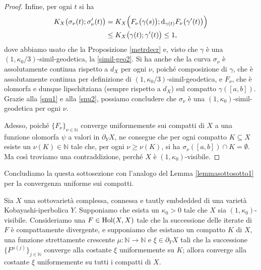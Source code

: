 \begin{proof}
    Infine, per ogni $t$ si ha
    \begin{equation} \label{snu2}
        \begin{aligned}
            K_X\big(\sigma_\nu(t);\sigma_\nu'(t)\big)&=K_X\Big(F_\nu\big(\gamma(s)\big);\mathop{}\!\mathrm{d}_{\gamma(t)}F_\nu\big(\gamma'(t)\big)\Big) \\
            &\le K_X\big(\gamma(t);\gamma'(t)\big) \le 1,
        \end{aligned}
    \end{equation}
    dove abbiamo usato che la Proposizione \ref{metrdecr} e, visto che $\gamma$ è una $(1,\kappa_0/3)$-simil-geodetica, la \eqref{simil-geo2}. Si ha anche che la curva $\sigma_\nu$ è assolutamente continua rispetto a $d_X$ per ogni $\nu$, poiché composizione di $\gamma$, che è assolutamente continua per definizione di $(1,\kappa_0/3)$-simil-geodetica, e $F_\nu$, che è olomorfa e dunque lipschitziana (sempre rispetto a $d_X$) sul compatto $\gamma([a,b])$. Grazie alla \eqref{snu1} e alla \eqref{snu2}, possiamo concludere che $\sigma_\nu$ è una $(1,\kappa_0)$-simil-geodetica per ogni $\nu$.
    
    Adesso, poiché $\{F_\nu\}_{\nu\in\mathbb{N}}$ converge uniformemente sui compatti di $X$ a una funzione olomorfa $\psi$ a valori in $\partial_YX$, ne consegue che per ogni compatto $K\subseteq X$ esiste un $\nu(K)\in\mathbb{N}$ tale che, per ogni $\nu\ge\nu(K)$, si ha $\sigma_\nu([a,b])\cap K=\emptyset$. Ma così troviamo una contraddizione, perché $X$ è $(1,\kappa_0)$-visibile.
\end{proof}

Concludiamo la questa sottosezione con l'analogo del Lemma \ref{lemmasottosotto1} per la convergenza uniforme sui compatti.

\begin{lm} \label{lemmasottosotto2}
    Sia $X$ una sottovarietà complessa, connessa e tautly embdedded di una varietà Kobayashi-iperbolica $Y$. Supponiamo che esista un $\kappa_0>0$ tale che $X$ sia $(1,\kappa_0)$-visibile. Consideriamo una $F\in\textnormal{Hol}(X,X)$ tale che la successione delle iterate di $F$ è compattamente divergente, e supponiamo che esistano un compatto $K$ di $X$, una funzione strettamente crescente $\mu:\mathbb{N}\longrightarrow\mathbb{N}$ e $\xi\in\partial_YX$ tali che la successione $\{F^{\mu(j)}\}_{j\in\mathbb{N}}$ converge alla costante $\xi$ uniformemente su $K$; allora converge alla costante $\xi$ uniformemente su tutti i compatti di $X$.
\end{lm}

